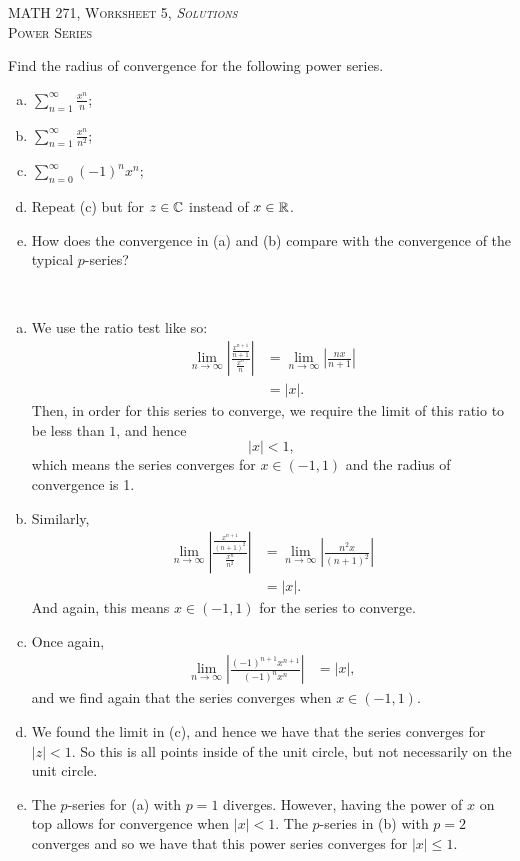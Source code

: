 \documentclass[12pt]{article} %
\begin{document}
\begin{center}
   \textsc{\large MATH 271, Worksheet 5, \emph{Solutions}}\\
   \textsc{Power Series}
\end{center}
\vspace{.5cm}

\begin{problem}
Find the radius of convergence for the following power series.
\begin{enumerate}[(a)]
    \item $\displaystyle{\sum_{n=1}^\infty \frac{x^n}{n}}$;
    \item $\displaystyle{\sum_{n=1}^\infty \frac{x^n}{n^2}}$;
    \item $\displaystyle{\sum_{n=0}^\infty (-1)^n x^n}$;
    \item Repeat (c) but for $z\in \mathbb{C}$ instead of $x\in \mathbb{R}$.
    \item How does the convergence in (a) and (b) compare with the convergence of the typical $p$-series?
\end{enumerate}
\end{problem}
\begin{solution}~
\begin{enumerate}[(a)]
    \item We use the ratio test like so:
    \begin{align*}
        \lim_{n\to \infty} \left| \frac{\frac{x^{n+1}}{n+1}}{\frac{x^n}{n}}\right|&= \lim_{n\to \infty} \left| \frac{nx}{n+1}\right|\\
        &= |x|.
    \end{align*}
    Then, in order for this series to converge, we require the limit of this ratio to be less than $1$, and hence
    \[
    |x|<1,
    \]
    which means the series converges for $x\in (-1,1)$ and the radius of convergence is 1.
    \item Similarly,
        \begin{align*}
        \lim_{n\to \infty} \left| \frac{\frac{x^{n+1}}{(n+1)^2}}{\frac{x^n}{n^2}}\right|&= \lim_{n\to \infty} \left| \frac{n^2x}{(n+1)^2}\right|\\
        &= |x|.
    \end{align*}
    And again, this means $x\in (-1,1)$ for the series to converge.
    \item Once again,
    \begin{align*}
        \lim_{n\to \infty} \left| \frac{(-1)^{n+1}x^{n+1}}{(-1)^nx^n}\right|&= |x|,
    \end{align*}
    and we find again that the series converges when $x\in (-1,1)$.
    \item We found the limit in (c), and hence we have that the series converges for $|z|<1$. So this is all points inside of the unit circle, but not necessarily on the unit circle.
    \item The $p$-series for (a) with $p=1$ diverges. However, having the power of $x$ on top allows for convergence when $|x|<1$. The $p$-series in (b) with $p=2$ converges and so we have that this power series converges for $|x|\leq 1$. 
\end{enumerate}
\end{solution}
\end{document}
